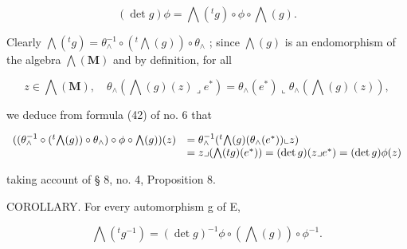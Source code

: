 \[
(\det g) \phi = \bigwedge (^ {t} g) \circ \phi \circ \bigwedge (g).\tag{79}
\]

Clearly \(\bigwedge(^{t}g) = \theta_{\wedge}^{-1}\circ (^{t}\bigwedge (g))\circ \theta_{\wedge}\) ; since \(\bigwedge (g)\) is an endomorphism of the algebra \(\bigwedge (\mathbf{M})\) and by definition, for all

\[
z \in \bigwedge (\mathbf {M}), \quad \theta_ {\wedge} (\bigwedge (g) (z) \lrcorner e ^ {*}) = \theta_ {\wedge} (e ^ {*}) \llcorner \theta_ {\wedge} (\bigwedge (g) (z)),
\]

we deduce from formula (42) of no. 6 that

\[
\begin{array}{r l} ((\theta_ {\wedge} ^ {- 1} \circ (^ {t} \bigwedge (g)) \circ \theta_ {\wedge}) \circ \phi \circ \bigwedge (g)) (z) & = \theta_ {\wedge} ^ {- 1} (^ {t} \bigwedge (g) (\theta_ {\wedge} (e ^ {*})) \llcorner z) \\ & = z \lrcorner (\bigwedge (t g) (e ^ {*})) = (\det g) (z \lrcorner e ^ {*}) = (\det g) \phi (z) \end{array}
\]

taking account of § 8, no. 4, Proposition 8.

COROLLARY. For every automorphism g of E,

\[
\bigwedge(^ {t} g ^ {- 1}) = (\det g) ^ {- 1} \phi \circ (\bigwedge (g)) \circ \phi^ {- 1}.\tag{80}
\]

